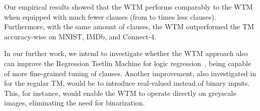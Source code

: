 \documentclass[letterpaper]{article}
\begin{document}
Our empirical results showed that the WTM performs comparably to the WTM when equipped with much fewer clauses (from  to  times less clauses). Furthermore, with the same amount of clauses, the WTM outperformed the TM accuracy-wise on MNIST, IMDb, and Connect-4.

In our further work, we intend to investigate whether the WTM approach also can improve the Regression Tsetlin Machine \cite{abeyrathna2019regressiontsetlin} for logic regression~\cite{ruczinski2003logic}, being capable of more fine-grained tuning of clauses. Another improvement, also investigated in \cite{abeyrathna2019scheme} for the regular TM, would be to introduce real-valued instead of binary inputs. This, for instance, would enable the WTM to operate directly on greyscale images, eliminating the need for binarization.



\end{document}
